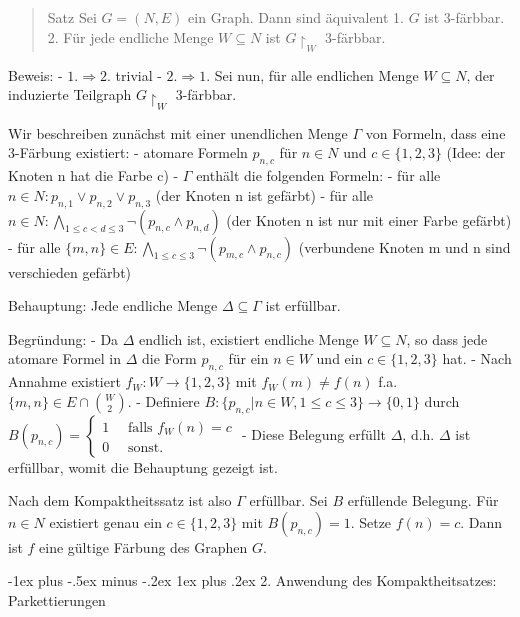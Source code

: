 \documentclass[a4paper]{article}
\makeatletter
\renewcommand{\subsubsection}{\@startsection{subsubsection}{3}{0mm}%
                {-1ex plus -.5ex minus -.2ex}%
                {1ex plus .2ex}%
                {\normalfont\small\bfseries}}
\makeatother
\begin{document}
\begin{multicols}{3}
  \begin{quote}
    Satz Sei $G= (N,E)$ ein Graph. Dann sind äquivalent 1. $G$ ist
    3-färbbar. 2. Für jede endliche Menge $W\subseteq N$ ist
    $G\upharpoonright_W$ 3-färbbar.
  \end{quote}

  Beweis: - $1.\Rightarrow 2.$ trivial - $2.\Rightarrow 1.$ Sei nun, für
  alle endlichen Menge $W\subseteq N$, der induzierte Teilgraph
  $G\upharpoonright_W$ 3-färbbar.

  Wir beschreiben zunächst mit einer unendlichen Menge $\Gamma$ von
  Formeln, dass eine 3-Färbung existiert: - atomare Formeln $p_{n,c}$ für
  $n\in N$ und $c\in\{1,2,3\}$ (Idee: der Knoten n hat die Farbe c) -
  $\Gamma$ enthält die folgenden Formeln: - für alle
  $n\in N:p_{n, 1} \vee p_{n, 2} \vee p_{n, 3}$ (der Knoten n ist gefärbt)
  - für alle
  $n\in N:\bigwedge_{1\leq c< d \leq 3} \lnot(p_{n,c} \wedge p_{n,d})$
  (der Knoten n ist nur mit einer Farbe gefärbt) - für alle
  $\{m,n\}\in E: \bigwedge_{1\leq c\leq 3} \lnot(p_{m,c} \wedge p_{n,c})$
  (verbundene Knoten m und n sind verschieden gefärbt)

  Behauptung: Jede endliche Menge $\Delta\subseteq\Gamma$ ist erfüllbar.

  Begründung: - Da $\Delta$ endlich ist, existiert endliche Menge
  $W\subseteq N$, so dass jede atomare Formel in $\Delta$ die Form
  $p_{n,c}$ für ein $n\in W$ und ein $c\in\{1,2,3\}$ hat. - Nach Annahme
  existiert $f_W:W\rightarrow\{1,2,3\}$ mit $f_W(m) \not=f(n)$ f.a.
  $\{m,n\}\in E\cap\binom{W}{2}$. - Definiere
  $B:\{p_{n,c}|n\in W, 1 \leq c\leq 3\}\rightarrow\{0,1\}$ durch
  $B(p_{n,c}) = \begin{cases} 1 \quad\text{ falls } f_W(n) = c \\ 0 \quad\text{ sonst.} \end{cases}$
  - Diese Belegung erfüllt $\Delta$, d.h. $\Delta$ ist erfüllbar, womit
  die Behauptung gezeigt ist.

  Nach dem Kompaktheitssatz ist also $\Gamma$ erfüllbar. Sei $B$
  erfüllende Belegung. Für $n\in N$ existiert genau ein $c\in\{1,2,3\}$
  mit $B(p_{n,c}) =1$. Setze $f(n) =c$. Dann ist $f$ eine gültige Färbung
  des Graphen $G$.

  \subsubsection{2. Anwendung des Kompaktheitsatzes:
    Parkettierungen}\label{anwendung-des-kompaktheitsatzes-parkettierungen}


\end{multicols}
\end{document}
